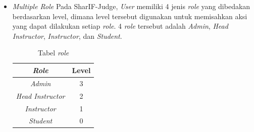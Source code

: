 \begin{itemize}
    \item {\textit{Multiple Role}}\newline
        Pada SharIF-Judge, \textit{User} memiliki 4 jenis \textit{role} yang dibedakan berdasarkan level, dimana level tersebut digunakan untuk memisahkan aksi yang dapat dilakukan setiap \textit{role}. 4 \textit{role} tersebut adalah \textit{Admin}, \textit{Head Instructor}, \textit{Instructor}, dan \textit{Student}. 
        
    \begin{table}[H] %
	    \centering 
	    \caption{Tabel \textit{role}}
	    \label{tab:level}
	    \begin{tabular}{|c|c|}
		    \hline
		    \textit{Role} & Level \\
		    \hline
		    \textit{Admin} & 3 \\
		    \hline
		    \textit{Head Instructor} & 2 \\
		    \hline
		    \textit{Instructor} & 1 \\
		    \hline
		    \textit{Student} & 0 \\
		    \hline
	    \end{tabular} 
    \end{table}
    

\end{itemize}
